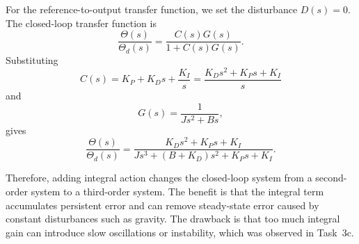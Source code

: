 \documentclass{article}
\begin{document}
For the reference-to-output transfer function, we set the disturbance $D(s)=0$. The closed-loop transfer function is
\begin{equation}
    \frac{\Theta(s)}{\Theta_d(s)}
    =
    \frac{C(s)G(s)}{1+C(s)G(s)}.
\end{equation}
Substituting
\[
    C(s)
    =
    K_P
    +
    K_Ds
    +
    \frac{K_I}{s}
    =
    \frac{K_Ds^2+K_Ps+K_I}{s}
\]
and
\[
    G(s)=\frac{1}{Js^2+Bs},
\]
gives
\begin{equation}
    \frac{\Theta(s)}{\Theta_d(s)}
    =
    \frac{K_Ds^2+K_Ps+K_I}
    {Js^3+(B+K_D)s^2+K_Ps+K_I}.
\end{equation}

Therefore, adding integral action changes the closed-loop system from a second-order system to a third-order system. The benefit is that the integral term accumulates persistent error and can remove steady-state error caused by constant disturbances such as gravity. The drawback is that too much integral gain can introduce slow oscillations or instability, which was observed in Task~3c.
\end{document}
